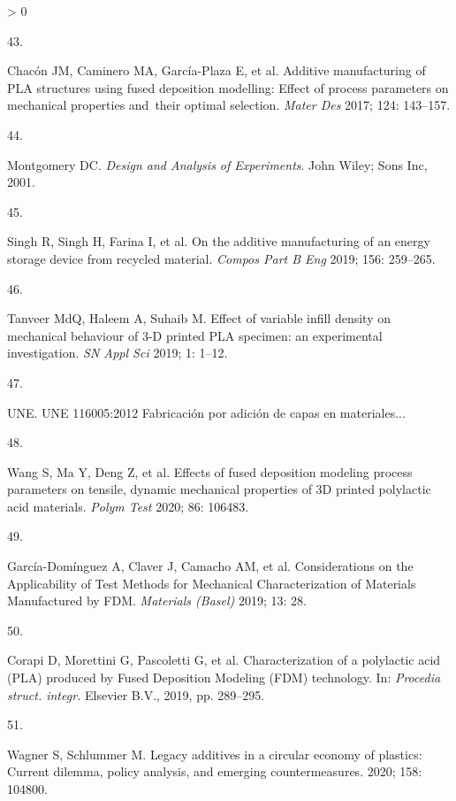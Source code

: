 \documentclass[
  12pt]{article}
\newlength{\cslhangindent}
\newlength{\csllabelwidth}
\newenvironment{CSLReferences}[2] %
 {%
  \setlength{\parindent}{0pt}
  \ifodd #1 \everypar{\setlength{\hangindent}{\cslhangindent}}\ignorespaces\fi
  \ifnum #2 > 0
  \setlength{\parskip}{#2\baselineskip}
  \fi
 }%
 {}
\newcommand{\CSLLeftMargin}[1]{\parbox[t]{\csllabelwidth}{#1}}
\newcommand{\CSLRightInline}[1]{\parbox[t]{\linewidth - \csllabelwidth}{#1}\break}
\begin{document}
\begin{CSLReferences}{0}{0}
\leavevmode\hypertarget{ref-Chacon2017}{}%
\CSLLeftMargin{43. }
\CSLRightInline{Chacón JM, Caminero MA, García-Plaza E, et al. {Additive manufacturing of PLA structures using fused deposition modelling: Effect of process parameters on mechanical properties and~their optimal selection}. \emph{Mater Des} 2017; 124: 143--157.}

\leavevmode\hypertarget{ref-Montgomery2001}{}%
\CSLLeftMargin{44. }
\CSLRightInline{Montgomery DC. \emph{{Design and Analysis of Experiments}}. John Wiley; Sons Inc, 2001.}

\leavevmode\hypertarget{ref-Singh2019}{}%
\CSLLeftMargin{45. }
\CSLRightInline{Singh R, Singh H, Farina I, et al. {On the additive manufacturing of an energy storage device from recycled material}. \emph{Compos Part B Eng} 2019; 156: 259--265.}

\leavevmode\hypertarget{ref-Tanveer2019}{}%
\CSLLeftMargin{46. }
\CSLRightInline{Tanveer MdQ, Haleem A, Suhaib M. {Effect of variable infill density on mechanical behaviour of 3-D printed PLA specimen: an experimental investigation}. \emph{SN Appl Sci} 2019; 1: 1--12.}

\leavevmode\hypertarget{ref-UNE}{}%
\CSLLeftMargin{47. }
\CSLRightInline{UNE. {UNE 116005:2012 Fabricaci{ó}n por adici{ó}n de capas en materiales...}}

\leavevmode\hypertarget{ref-Wang2020h}{}%
\CSLLeftMargin{48. }
\CSLRightInline{Wang S, Ma Y, Deng Z, et al. {Effects of fused deposition modeling process parameters on tensile, dynamic mechanical properties of 3D printed polylactic acid materials}. \emph{Polym Test} 2020; 86: 106483.}

\leavevmode\hypertarget{ref-Garcia-Dominguez2020}{}%
\CSLLeftMargin{49. }
\CSLRightInline{García-Domínguez A, Claver J, Camacho AM, et al. {Considerations on the Applicability of Test Methods for Mechanical Characterization of Materials Manufactured by FDM}. \emph{Materials (Basel)} 2019; 13: 28.}

\leavevmode\hypertarget{ref-Corapi2019}{}%
\CSLLeftMargin{50. }
\CSLRightInline{Corapi D, Morettini G, Pascoletti G, et al. {Characterization of a polylactic acid (PLA) produced by Fused Deposition Modeling (FDM) technology}. In: \emph{Procedia struct. integr.} Elsevier B.V., 2019, pp. 289--295.}

\leavevmode\hypertarget{ref-Wagner2020}{}%
\CSLLeftMargin{51. }
\CSLRightInline{Wagner S, Schlummer M. {Legacy additives in a circular economy of plastics: Current dilemma, policy analysis, and emerging countermeasures}. 2020; 158: 104800.}


\end{CSLReferences}
\end{document}
